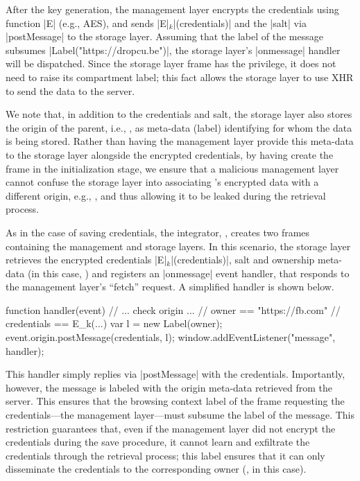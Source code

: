 % 
After the key generation, the management layer encrypts the
credentials using function \js|E| (e.g., AES), and sends
\js|E|$_k$\js|(credentials)| and the \js|salt| via \js|postMessage| to
the storage layer.
%
Assuming that the label of the message subsumes
\js|Label("https://dropcu.be")|, the storage layer's \js|onmessage|
handler will be dispatched. 
%
Since the storage layer frame has the  privilege, it
does not need to raise its compartment label; this fact allows the
storage layer to use XHR to send the data to the 
server.
 
We note that, in addition to the credentials and salt, the storage
layer also stores the origin of the parent, i.e., , as
meta-data (label) identifying for whom the data is being stored.
%
Rather than having the management layer provide this meta-data to the
storage layer alongside the encrypted credentials, by having
 create the frame in the initialization stage, we ensure
that a malicious management layer cannot confuse the storage layer
into associating 's encrypted data with a different
origin, e.g., , and thus allowing it to be leaked during
the retrieval process.

%
As in the case of saving credentials, the integrator, ,
creates two frames containing the management and storage layers.
%
In this scenario, the storage layer retrieves the encrypted credentials
\js|E|$_k$\js|(credentials)|, salt and ownership meta-data (in this
case, ) and registers an \js|onmessage| event handler,
that responds to the management layer's ``fetch'' request.
A simplified handler is shown below.
\begin{jscode}
function handler(event) {
  // ... check origin ...
  // owner == "https://fb.com"
  // credentials == E_k(...)
  var l = new Label(owner);
  event.origin.postMessage(credentials, l);
} 
window.addEventListener("message", handler);
\end{jscode}
This handler simply replies via \js|postMessage| with the credentials.
%
Importantly, however, the message is labeled with the origin meta-data
retrieved from the server.
%
This ensures that the browsing context label of the frame requesting
the credentials---the management layer---must subsume the label of the
message. 
%
This restriction guarantees that, even if the management layer did not encrypt the
credentials during the save procedure, it cannot learn and
exfiltrate the credentials through the retrieval process; this
label ensures that it can only disseminate the credentials to the
corresponding owner (, in this case).
%

